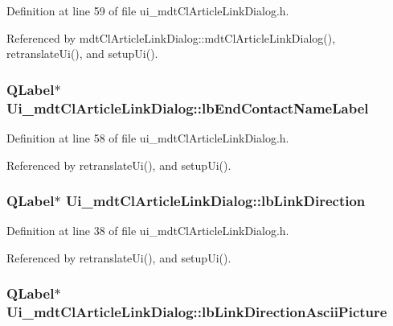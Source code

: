 Definition at line 59 of file ui\-\_\-mdt\-Cl\-Article\-Link\-Dialog.\-h.



Referenced by mdt\-Cl\-Article\-Link\-Dialog\-::mdt\-Cl\-Article\-Link\-Dialog(), retranslate\-Ui(), and setup\-Ui().

\hypertarget{class_ui__mdt_cl_article_link_dialog_afe327a4f03402dcd26dd33ec7a45d625}{
\subsubsection[{lb\-End\-Contact\-Name\-Label}]{\setlength{\rightskip}{0pt plus 5cm}Q\-Label$\ast$ Ui\-\_\-mdt\-Cl\-Article\-Link\-Dialog\-::lb\-End\-Contact\-Name\-Label}}\label{class_ui__mdt_cl_article_link_dialog_afe327a4f03402dcd26dd33ec7a45d625}


Definition at line 58 of file ui\-\_\-mdt\-Cl\-Article\-Link\-Dialog.\-h.



Referenced by retranslate\-Ui(), and setup\-Ui().

\hypertarget{class_ui__mdt_cl_article_link_dialog_a58f74c65a6847e0a524d99bdc6b2c660}{
\subsubsection[{lb\-Link\-Direction}]{\setlength{\rightskip}{0pt plus 5cm}Q\-Label$\ast$ Ui\-\_\-mdt\-Cl\-Article\-Link\-Dialog\-::lb\-Link\-Direction}}\label{class_ui__mdt_cl_article_link_dialog_a58f74c65a6847e0a524d99bdc6b2c660}


Definition at line 38 of file ui\-\_\-mdt\-Cl\-Article\-Link\-Dialog.\-h.



Referenced by retranslate\-Ui(), and setup\-Ui().

\hypertarget{class_ui__mdt_cl_article_link_dialog_aa5dac2f5f98845adbc8fedceceeac71e}{
\subsubsection[{lb\-Link\-Direction\-Ascii\-Picture}]{\setlength{\rightskip}{0pt plus 5cm}Q\-Label$\ast$ Ui\-\_\-mdt\-Cl\-Article\-Link\-Dialog\-::lb\-Link\-Direction\-Ascii\-Picture}}\label{class_ui__mdt_cl_article_link_dialog_aa5dac2f5f98845adbc8fedceceeac71e}


